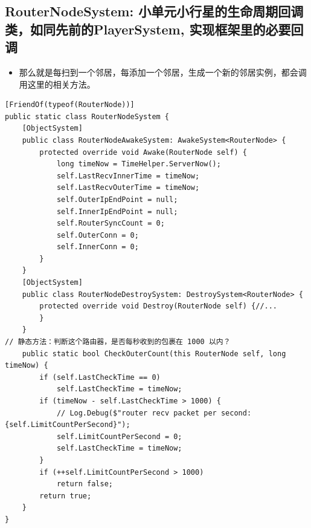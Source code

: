 \documentclass[9pt, b5paper]{article}
\begin{document}
\subsection{RouterNodeSystem: 小单元小行星的生命周期回调类，如同先前的PlayerSystem, 实现框架里的必要回调}
\label{sec:org84ff3b5}
\begin{itemize}
\item 那么就是每扫到一个邻居，每添加一个邻居，生成一个新的邻居实例，都会调用这里的相关方法。
\end{itemize}
\begin{verbatim}
[FriendOf(typeof(RouterNode))]
public static class RouterNodeSystem {
    [ObjectSystem]
    public class RouterNodeAwakeSystem: AwakeSystem<RouterNode> {
        protected override void Awake(RouterNode self) {
            long timeNow = TimeHelper.ServerNow();
            self.LastRecvInnerTime = timeNow;
            self.LastRecvOuterTime = timeNow;
            self.OuterIpEndPoint = null;
            self.InnerIpEndPoint = null;
            self.RouterSyncCount = 0;
            self.OuterConn = 0;
            self.InnerConn = 0;
        }
    }
    [ObjectSystem]
    public class RouterNodeDestroySystem: DestroySystem<RouterNode> {
        protected override void Destroy(RouterNode self) {//...
        }
    }
// 静态方法：判断这个路由器，是否每秒收到的包裹在 1000 以内？
    public static bool CheckOuterCount(this RouterNode self, long timeNow) {
        if (self.LastCheckTime == 0) 
            self.LastCheckTime = timeNow;
        if (timeNow - self.LastCheckTime > 1000) {
            // Log.Debug($"router recv packet per second: {self.LimitCountPerSecond}");
            self.LimitCountPerSecond = 0;
            self.LastCheckTime = timeNow;
        }
        if (++self.LimitCountPerSecond > 1000) 
            return false;
        return true;
    }
}
\end{verbatim}
\end{document}
